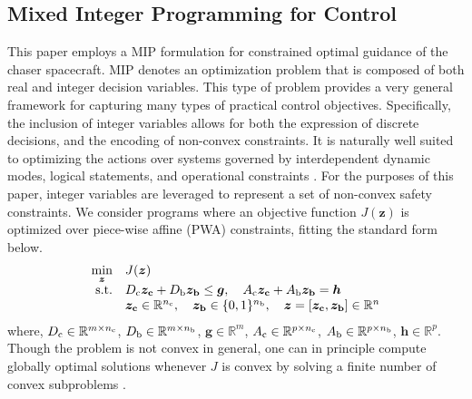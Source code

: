 \documentclass[twocolumn,letterpaper]{IEEEAerospaceCLS}  %
\theoremstyle{definition}
\begin{document}
\subsection{Mixed Integer Programming for Control}
\label{sec: MIP_overview}
This paper employs a MIP formulation for constrained optimal guidance of the chaser spacecraft. MIP denotes an optimization problem that is composed of both real and integer decision variables. This type of problem provides a very general framework for capturing many types of practical control objectives. Specifically, the inclusion of integer variables allows for both the expression of discrete decisions, and the encoding of non-convex constraints.
It is naturally well suited to optimizing the actions over systems governed by interdependent dynamic modes, logical statements, and operational constraints \cite{bemporad1999control,Borrelli:2017:PCL:3164811}. 
For the purposes of this paper, integer variables are leveraged to represent a set of non-convex safety constraints. 
We consider programs where an objective function $J(\boldsymbol{z})$ is optimized over piece-wise affine (PWA) constraints, fitting the standard form below. 
\begin{equation}
\begin{array}{rl}
\underset{\boldsymbol{z}}{\text{min}} & J(\boldsymbol{z}) \\
\text{s.t.} & {D_{\rm c}} \boldsymbol{z_{\rm c}} + {D_{\rm b}} \boldsymbol{z_{\rm b}} \leq \boldsymbol{g}, \quad {A_{\rm c}} \boldsymbol{z_{\rm c}} + {A_{\rm b}} \boldsymbol{z_{\rm b}} = \boldsymbol{h} \\
& \boldsymbol{z_{\rm c}} \in{\mathbb R}^{n_{\rm c}}, \quad \boldsymbol{z_{\rm b}} \in \{0,1\}^{n_{\rm b}}, \quad  \boldsymbol{z} = [\boldsymbol{z_{\rm c}}, \boldsymbol{z_{\rm b}}] \in {\mathbb R}^n
\end{array}\label{eq:MIQP_general_form}
\end{equation}
where, ${D_{\rm c}} \in {\mathbb R}^{m \times n_{\rm c}}$, ${D_{\rm b}} \in {\mathbb R}^{m \times n_{\rm b}}$, $\boldsymbol{g}\in {\mathbb R}^m$, ${A_{\rm c}} \in {\mathbb R}^{p \times n_{\rm c}}$, ${A_{\rm b}} \in {\mathbb R}^{p \times n_{\rm b}}$, $\boldsymbol{h}\in {\mathbb R}^p$. Though the problem is not convex in general, one can in principle compute globally optimal solutions whenever $J$ is convex by solving a finite number of convex subproblems \cite{lubin2017mixed}.
\end{document}
